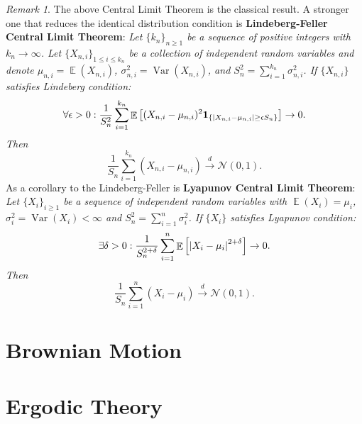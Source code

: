 \documentclass[hidelinks,11pt]{article}
\theoremstyle{definition}
\theoremstyle{dotless}
\theoremstyle{remark}
\newtheorem*{remark}{Remark}
\DeclareMathOperator{\Var}{Var}
\DeclareMathOperator{\E}{\mathbb{E}}
\DeclareMathOperator{\1}{\mathbf{1}}
\begin{document}
\begin{remark}
The above Central Limit Theorem is the classical result. A stronger one that reduces the identical distribution condition is \textbf{Lindeberg-Feller Central Limit Theorem}:\smallbreak
\textit{Let $\{k_n\}_{n\geq1}$ be a sequence of positive integers with $k_n\to\infty$. Let $\{X_{n,i}\}_{1\leq i\leq k_n}$ be a collection of independent random variables and denote $\mu_{n,i}=\E(X_{n,i})$, $\sigma_{n,i}^2=\Var(X_{n,i})$, and $S_n^2=\sum_{i=1}^{k_n}\sigma_{n,i}^2$. If $\{X_{n,i}\}$ satisfies Lindeberg condition:}
\[\forall\epsilon>0:\frac{1}{S_n^2}\sum_{i=1}^{k_n}\E\left[(X_{n,i}-\mu_{n,i})^2\textbf{1}_{\{\abs{X_{n,i}-\mu_{n,i}}\geq\epsilon S_n\}}\right]\to0.\]
\textit{Then}
\[\frac{1}{S_n}\sum_{i=1}^{k_n}(X_{n,i}-\mu_{n,i})\xrightarrow{d}\mathcal{N}(0,1).\]
As a corollary to the Lindeberg-Feller is \textbf{Lyapunov Central Limit Theorem}:\smallbreak
\textit{Let $\{X_i\}_{i\geq1}$ be a sequence of independent random variables with $\E(X_i)=\mu_i$, $\sigma_i^2=\Var(X_i)<\infty$ and $S_n^2=\sum_{i=1}^n\sigma_i^2$. If $\{X_i\}$ satisfies Lyapunov condition:}
\[\exists\delta>0:\frac{1}{S_n^{2+\delta}}\sum_{i=1}^n\E\left[\abs{X_i-\mu_i}^{2+\delta}\right]\to0.\]
\textit{Then}
\[\frac{1}{S_n}\sum_{i=1}^n(X_i-\mu_i)\xrightarrow{d}\mathcal{N}(0,1).\]
\end{remark}

\section{Brownian Motion}

\section{Ergodic Theory}
\end{document}
